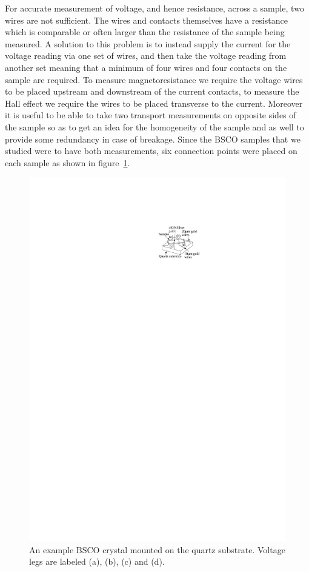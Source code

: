 For accurate measurement of voltage, and hence resistance, across a sample, two wires are not sufficient. The wires and contacts themselves have a resistance which is comparable or often larger than the resistance of the sample being measured. A solution to this problem is to instead supply the current for the voltage reading via one set of wires, and then take the voltage reading from another set meaning that a minimum of four wires and four contacts on the sample are required. To measure magnetoresistance we require the voltage wires to be placed upstream and downstream of the current contacts, to measure the Hall effect we require the wires to be placed transverse to the current. Moreover it is useful to be able to take two transport measurements on opposite sides of the sample so as to get an idea for the homogeneity of the sample and as well to provide some redundancy in case of breakage. Since the \ac{BSCO} samples that we studied were to have both measurements, six connection points were placed on each sample as shown in figure~\ref{Fig:Exp:BSCOSampleSchematic}.
\begin{figure}[htbp]
    \begin{center}
        \includegraphics[scale=1.1]{Chapter-ExperimentalTechnique/Figures/BSCOSampleSchematic/BSCOSampleSchematic}
        \caption{An example \ac{BSCO} crystal mounted on the quartz substrate. Voltage legs are labeled (a), (b), (c) and (d).}
        \label{Fig:Exp:BSCOSampleSchematic}
    \end{center}
\end{figure}
